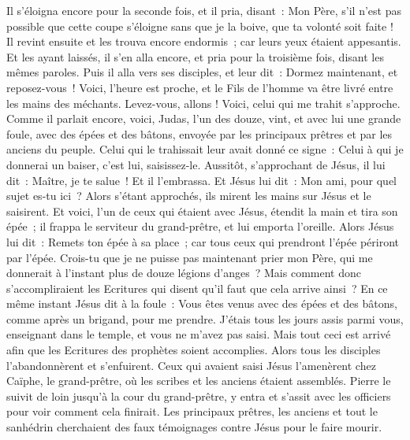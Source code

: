 \begin{multicols}{2}
Il s'éloigna encore pour la seconde fois, et il pria, disant~: Mon Père, s'il n'est pas possible que cette coupe s'éloigne sans que je la boive, que ta volonté soit faite !
Il revint ensuite et les trouva encore endormis~; car leurs yeux étaient appesantis.
Et les ayant laissés, il s'en alla encore, et pria pour la troisième fois, disant les mêmes paroles.
Puis il alla vers ses disciples, et leur dit~: Dormez maintenant, et reposez-vous~! Voici, l'heure est proche, et le Fils de l'homme va être livré entre les mains des méchants.
Levez-vous, allons ! Voici, celui qui me trahit s'approche.
Comme il parlait encore, voici, Judas, l'un des douze, vint, et avec lui une grande foule, avec des épées et des bâtons, envoyée par les principaux prêtres et par les anciens du peuple.
Celui qui le trahissait leur avait donné ce signe~: Celui à qui je donnerai un baiser, c'est lui, saisissez-le.
Aussitôt, s'approchant de Jésus, il lui dit~: Maître, je te salue~! Et il l'embrassa.
Et Jésus lui dit~: Mon ami, pour quel sujet es-tu ici~? Alors s'étant approchés, ils mirent les mains sur Jésus et le saisirent.
Et voici, l'un de ceux qui étaient avec Jésus, étendit la main et tira son épée~; il frappa le serviteur du grand-prêtre, et lui emporta l'oreille.
Alors Jésus lui dit~: Remets ton épée à sa place~; car tous ceux qui prendront l'épée périront par l'épée.
Crois-tu que je ne puisse pas maintenant prier mon Père, qui me donnerait à l'instant plus de douze légions d'anges~?
Mais comment donc s'accompliraient les Ecritures qui disent qu'il faut que cela arrive ainsi~?
En ce même instant Jésus dit à la foule~: Vous êtes venus avec des épées et des bâtons, comme après un brigand, pour me prendre. J'étais tous les jours assis parmi vous, enseignant dans le temple, et vous ne m'avez pas saisi.
Mais tout ceci est arrivé afin que les Ecritures des prophètes soient accomplies. Alors tous les disciples l'abandonnèrent et s'enfuirent.
Ceux qui avaient saisi Jésus l'amenèrent chez Caïphe, le grand-prêtre, où les scribes et les anciens étaient assemblés.
Pierre le suivit de loin jusqu'à la cour du grand-prêtre, y entra et s'assit avec les officiers pour voir comment cela finirait.
Les principaux prêtres, les anciens et tout le sanhédrin cherchaient des faux témoignages contre Jésus pour le faire mourir.

\end{multicols}
